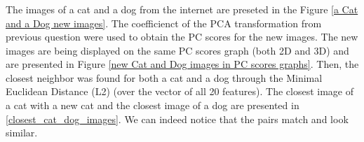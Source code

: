 \documentclass[a4paper]{iacas}
\begin{document}
\subsubsection{}
The images of a cat and a dog from the internet are preseted in the Figure \ref{a Cat and a Dog new images}. The coefficienct of the PCA transformation from previous question were used to obtain the PC scores for the new images. The new images are being displayed on the same PC scores graph (both 2D and 3D) and are presented in Figure \ref{new Cat and Dog images in PC scores graphs}. Then, the closest neighbor was found for both a cat and a dog through the Minimal Euclidean Distance (L2) (over the vector of all 20 features).  The closest image of a cat with a new cat and the closest image of a dog are presented in \ref{closest_cat_dog_images}. We can indeed notice that the pairs match and look similar.
\end{document}
